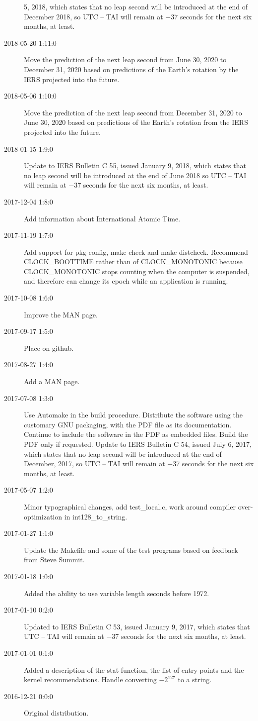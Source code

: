 \documentclass[letterpaper,twoside]{article}
\begin{document}
\begin{description}
  5, 2018, which states that no leap second will be introduced
  at the end of December 2018, so UTC -- TAI will remain at
  \num{-37} seconds for the next six months, at least.
\item[2018-05-20 1:11:0] Move the prediction of the next leap second
  from June 30, 2020 to December 31, 2020 based on predictions of
  the Earth's rotation by the IERS projected into the future.
\item[2018-05-06 1:10:0] Move the prediction of the next leap second
  from December 31, 2020 to June 30, 2020 based on predictions
  of the Earth's rotation from the IERS projected into the future.
\item[2018-01-15 1:9:0] Update to IERS Bulletin C 55, issued
  January 9, 2018, which states that no leap second will be introduced
  at the end of June 2018 so UTC -- TAI will remain at \num{-37} seconds
  for the next six months, at least.
\item[2017-12-04 1:8:0] Add information about International Atomic Time.
\item[2017-11-19 1:7:0] Add support for pkg-config, make check and
  make distcheck.  Recommend CLOCK\_BOOTTIME rather than of CLOCK\_MONOTONIC
  because CLOCK\_MONOTONIC stops counting when the computer is suspended,
  and therefore can change its epoch while an application is running.
\item[2017-10-08 1:6:0] Improve the MAN page.
\item[2017-09-17 1:5:0] Place on github.
\item[2017-08-27 1:4:0] Add a MAN page.
\item[2017-07-08 1:3:0] Use Automake in the build procedure.
  Distribute the software using the customary GNU packaging,
  with the PDF file as its documentation.  Continue to include
  the software in the PDF as embedded files.  Build the PDF
  only if requested.  Update to IERS Bulletin C 54, issued
  July 6, 2017, which states that no leap second will be introduced
  at the end of December, 2017, so UTC -- TAI will remain at
  \num{-37} seconds for the next six months, at least.
\item[2017-05-07 1:2:0] Minor typographical changes, add test\_local.c,
  work around compiler over-optimization in int128\_to\_string.
\item[2017-01-27 1:1:0] Update the Makefile and some of the test programs
  based on feedback from Steve Summit.
\item[2017-01-18 1:0:0] Added the ability to use variable length seconds
  before 1972.
\item[2017-01-10 0:2:0] Updated to IERS Bulletin C 53,
  issued January 9, 2017, which states that UTC -- TAI
  will remain at \num{-37} seconds for the next six months, at least.
\item[2017-01-01 0:1:0] Added a description of the stat function,
  the list of entry points and the kernel recommendations.
  Handle converting $-2^{127}$ to a string. 
\item[2016-12-21 0:0:0] Original distribution.
\end{description}


\end{document}
